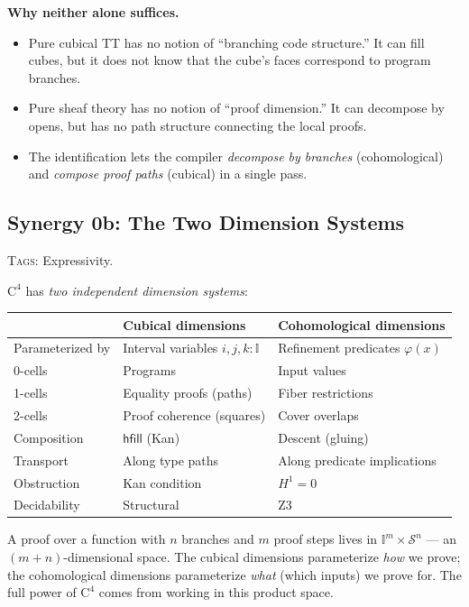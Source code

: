 \documentclass[11pt,a4paper]{article}
\theoremstyle{definition}
\theoremstyle{plain}
\newcommand{\Hone}{H^1}
\newcommand{\site}{\mathcal{S}}
\newcommand{\interval}{\mathbb{I}}
\newcommand{\hfilling}{\mathsf{hfill}}
\begin{document}
\noindent
\textbf{Why neither alone suffices.}
\begin{itemize}
\item Pure cubical TT has no notion of ``branching code structure.''
  It can fill cubes, but it does not know that the cube's faces
  correspond to program branches.
\item Pure sheaf theory has no notion of ``proof dimension.''  It
  can decompose by opens, but has no path structure connecting
  the local proofs.
\item The identification lets the compiler \emph{decompose by branches}
  (cohomological) and \emph{compose proof paths} (cubical) in a
  single pass.
\end{itemize}


\subsection{Synergy 0b: The Two Dimension Systems}
\label{sec:syn-two-dimensions}

\textsc{Tags:} Expressivity.

\medskip\noindent
$\mathrm{C}^4$ has \emph{two independent dimension systems}:

\begin{center}
\begin{tabular}{lll}
\toprule
& \textbf{Cubical dimensions} & \textbf{Cohomological dimensions} \\
\midrule
Parameterized by & Interval variables $i, j, k : \interval$ &
  Refinement predicates $\varphi(x)$ \\
0-cells & Programs & Input values \\
1-cells & Equality proofs (paths) & Fiber restrictions \\
2-cells & Proof coherence (squares) & Cover overlaps \\
Composition & $\hfilling$ (Kan) & Descent (gluing) \\
Transport & Along type paths & Along predicate implications \\
Obstruction & Kan condition & $\Hone = 0$ \\
Decidability & Structural & Z3 \\
\bottomrule
\end{tabular}
\end{center}

A proof over a function with $n$ branches and $m$ proof steps
lives in $\interval^m \times \site^n$ --- an $(m{+}n)$-dimensional
space.  The cubical dimensions parameterize \emph{how} we prove;
the cohomological dimensions parameterize \emph{what} (which inputs)
we prove for.  The full power of $\mathrm{C}^4$ comes from
working in this product space.
\end{document}
